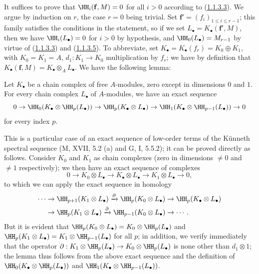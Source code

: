 It suffices to prove that $\HH_i(\mathbf{f},M)=0$ for all $i>0$ according to (\hyperref[III.1.1.3.3]{1.1.3.3}).
We argue by induction on $r$, the case $r=0$ being trivial.
Set $\mathbf{f}'=(f_i)_{1\leq i\leq r-1}$; this family satisfies the conditions in the statement, so if we set $L_\bullet=K_\bullet(\mathbf{f}',M)$, then we have $\HH_i(L_\bullet)=0$ for $i>0$ by hypothesis, and $\HH_0(L_\bullet)=M_{r-1}$ by virtue of (\hyperref[III.1.1.3.3]{1.1.3.3}) and (\hyperref[III.1.1.3.5]{1.1.3.5}).
To abbreviate, set $K_\bullet=K_\bullet(f_r)=K_0\oplus K_1$, with $K_0=K_1=A$, $d_1:K_1\to K_0$ multiplication by $f_r$; we have by definition  that $K_\bullet(\mathbf{f},M)=K_\bullet\otimes_A L_\bullet$.
We have the following lemma:

\begin{lemma}[1.1.4.1]
\label{III.1.1.4.1}
Let $K_\bullet$ be a chain complex of free $A$-modules, zero except in dimensions $0$ and $1$.
For every chain complex $L_\bullet$ of $A$-modules, we have an exact sequence
\[
  0\to\HH_0(K_\bullet\otimes\HH_p(L_\bullet))\to\HH_p(K_\bullet\otimes L_\bullet)\to\HH_1(K_\bullet\otimes\HH_{p-1}(L_\bullet))\to 0
\]
for every index $p$.
\end{lemma}

This is a particular case of an exact sequence of low-order terms of the K\"unneth spectral sequence (M, XVII, 5.2 (a) and G, I, 5.5.2); it can be proved directly as follows.
Consider $K_0$ and $K_1$ as chain complexes (zero in dimensions $\neq 0$ and $\neq 1$ respectively); we then have an exact sequence of complexes
\[
  0\to K_0\otimes L_\bullet\to K_\bullet\otimes L_\bullet\to K_1\otimes L_\bullet\to 0,
\]
to which we can apply the exact sequence in homology
\[
  \begin{aligned}
  \cdots&\to\HH_{p+1}(K_1\otimes L_\bullet)
  \xrightarrow{\partial}\HH_p(K_0\otimes L_\bullet)
  \to\HH_p(K_\bullet\otimes L_\bullet)\\
  &\to\HH_p(K_1\otimes L_\bullet)
  \xrightarrow{\partial}\HH_{p-1}(K_0\otimes L_\bullet)\to\cdots.
  \end{aligned}
\]
But it is evident that $\HH_p(K_0\otimes L_\bullet)=K_0\otimes\HH_p(L_\bullet)$ and $\HH_p(K_1\otimes L_\bullet)=K_1\otimes\HH_{p-1}(L_\bullet)$ for all $p$; in addition, we verify immediately that the operator $\partial:K_1\otimes\HH_p(L_\bullet)\to K_0\otimes\HH_p(L_\bullet)$ is none other than $d_1\otimes 1$; the lemma thus follows from the above exact sequence and the definition of $\HH_0(K_\bullet\otimes\HH_p(L_\bullet))$ and $\HH_1(K_\bullet\otimes\HH_{p-1}(L_\bullet))$.

